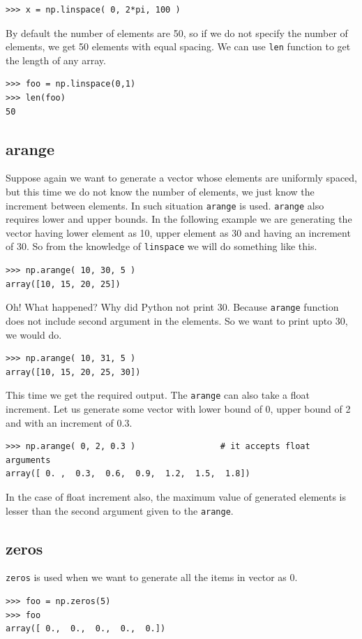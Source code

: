 \documentclass[10pt]{book}
\begin{document}
{\beforeverb \begin{verbatim}
>>> x = np.linspace( 0, 2*pi, 100 )     
\end{verbatim} \afterverb

By default the number of elements are 50, so if we do not specify the number of elements, we get 50 elements with equal spacing. We can use \verb"len" function to get the length of any array.
\beforeverb
\begin{verbatim}
>>> foo = np.linspace(0,1)
>>> len(foo)
50
\end{verbatim}
\afterverb

\subsection{arange}
Suppose again we want to generate a vector whose elements are uniformly spaced, but this time we do not know the number of elements, we just know the increment between elements. In such situation \verb"arange" is used. \verb"arange" also requires lower and upper bounds. In the following example we are generating the vector having lower element as 10, upper element as 30 and having an increment of 30. So from the knowledge of \verb"linspace" we will do something like this.
\beforeverb \begin{verbatim}
>>> np.arange( 10, 30, 5 )
array([10, 15, 20, 25])
\end{verbatim} \afterverb

Oh! What happened? Why did Python not print 30. Because \verb"arange" function does not include second argument in the elements. So we want to print upto 30, we would do.
\beforeverb \begin{verbatim}
>>> np.arange( 10, 31, 5 )
array([10, 15, 20, 25, 30])
\end{verbatim} \afterverb
This time we get the required output. The \verb"arange" can also take a float increment. Let us generate some vector with lower bound of 0, upper bound of 2 and with an increment of 0.3. 
\beforeverb \begin{verbatim}
>>> np.arange( 0, 2, 0.3 )                 # it accepts float arguments
array([ 0. ,  0.3,  0.6,  0.9,  1.2,  1.5,  1.8])
\end{verbatim} \afterverb
In the case of float increment also, the maximum value of generated elements is lesser than the second argument given to the \verb"arange".

\subsection{zeros}
\verb"zeros" is used when we want to generate all the items in vector as 0.
\beforeverb \begin{verbatim}
>>> foo = np.zeros(5)
>>> foo
array([ 0.,  0.,  0.,  0.,  0.])
\end{verbatim} \afterverb

}
\end{document}
